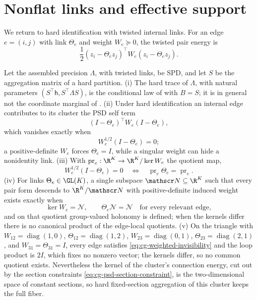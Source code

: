 \section{Nonflat links and effective support}
\label{sec:cg-effective-support}

We return to hard identification with twisted internal links. For an edge
\(e=(i,j)\) with link \(\Theta_e\) and weight \(W_e\succeq0\), the twisted pair
energy is
\begin{equation}
\frac12(z_i-\Theta_ez_j)^\top W_e(z_i-\Theta_ez_j).
\label{eq:cg-twisted-pair}
\end{equation}

Let the assembled precision \(\Lambda\), with twisted links, be SPD, and let
\(S\) be the aggregation matrix of a hard partition.
(i) The hard trace of \(\Lambda\), with natural parameters
\((S^\top\mathsf h,S^\top\Lambda S)\), is the conditional law of
 with \(B=S\); it is in general not the
coordinate marginal of .
(ii) Under hard identification an internal edge contributes to its cluster the
PSD self term
\begin{equation}
(I-\Theta_e)^\top W_e(I-\Theta_e),
\label{eq:cg-internal-residual}
\end{equation}
which vanishes exactly when
\begin{equation}
W_e^{1/2}(I-\Theta_e)=0 ;
\label{eq:cg-weighted-invisibility}
\end{equation}
a positive-definite \(W_e\) forces \(\Theta_e=I\), while a singular weight can
hide a nonidentity link.
(iii) With \(\operatorname{pr}_e:\R^K\to\R^K/\ker W_e\) the quotient map,
\begin{equation}
W_e^{1/2}(I-\Theta_e)=0
\quad\Longleftrightarrow\quad
\operatorname{pr}_e\Theta_e=\operatorname{pr}_e .
\label{eq:cg-edge-quotient}
\end{equation}
(iv) For links \(\Theta_e\in\GL(K)\), a single subspace \(\mathscr N\subseteq\R^K\)
such that every pair form descends to \(\R^K/\mathscr N\) with positive-definite
induced weight exists exactly when
\begin{equation}
\ker W_e=\mathscr N,\qquad \Theta_e\mathscr N=\mathscr N
\quad\text{for every relevant edge},
\label{eq:cg-common-quotient}
\end{equation}
and on that quotient group-valued holonomy is defined; when the kernels differ
there is no canonical product of the edge-local quotients.
(v) On the triangle with
\(W_{12}=\operatorname{diag}(1,0)\), \(\Theta_{12}=\operatorname{diag}(1,2)\),
\(W_{23}=\operatorname{diag}(0,1)\), \(\Theta_{23}=\operatorname{diag}(2,1)\), and
\(W_{31}=\Theta_{31}=I\), every edge satisfies \eqref{eq:cg-weighted-invisibility}
and the loop product is \(2I\), which fixes no nonzero vector; the kernels
differ, so no common quotient exists. Nevertheless the kernel of the cluster's
connection energy, cut out by the section constraints
\eqref{eq:cg-psd-section-constraint}, is the two-dimensional space of constant
sections, so hard fixed-section aggregation of this cluster keeps the full
fiber. 

